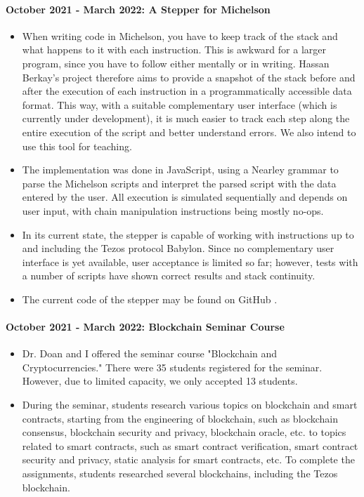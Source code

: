 \documentclass[a4paper,11pt]{article}
\begin{document}
\paragraph{October 2021 - March 2022: A Stepper for Michelson} 
\begin{itemize}
\item When writing code in Michelson, you have to keep track of the stack and what happens to it with each instruction. This is awkward for a larger program, since you have to follow either mentally or in writing. Hassan Berkay's project therefore aims to provide a snapshot of the stack before and after the execution of each instruction in a programmatically accessible data format. This way, with a suitable complementary user interface (which is currently under development), it is much easier to track each step along the entire execution of the script and better understand errors. We also intend to use this tool for teaching.
\item The implementation was done in
JavaScript, using a Nearley grammar to parse the Michelson scripts and interpret the parsed script with the data entered by the user. 
All execution is simulated sequentially and depends on user input, with chain manipulation instructions being mostly no-ops. 
\item In its current state, the stepper is capable of working with instructions up to and including the Tezos protocol Babylon. Since no complementary user interface is yet available, user acceptance is limited so far; however, tests with a number of scripts have shown correct results and stack continuity.
\item The current code of the stepper may be found on GitHub \cite{michelson-interpreter}.
\end{itemize}

\paragraph{October 2021 - March 2022: Blockchain Seminar Course} 
\begin{itemize}
\item Dr. Doan and I offered the seminar course "Blockchain and Cryptocurrencies." There were 35 students registered for the seminar. However, due to limited capacity, we only accepted 13 students.  
\item During the seminar, students research various topics on blockchain and smart contracts, starting from the engineering of blockchain, such as blockchain consensus, blockchain security and privacy, blockchain oracle, etc. to topics related to smart contracts, such as smart contract verification, smart contract security and privacy, static analysis for smart contracts, etc. To complete the assignments, students researched several blockchains, including the Tezos blockchain.
\end{itemize}
\end{document}
